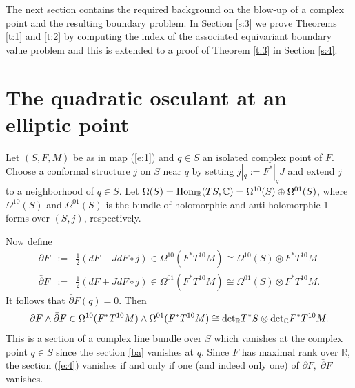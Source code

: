\documentclass{amsart}
\newcommand{\be}{\begin{equation}}
\newcommand{\ee}{\end{equation}}
\newcommand{\bea}{\begin{eqnarray}}
\newcommand{\eea}{\end{eqnarray}}
\begin{document}
The next section contains the required background on the blow-up of a complex point and the resulting boundary problem. In Section \ref{s:3} we prove Theorems \ref{t:1} and \ref{t:2} by computing the index of the associated equivariant boundary value problem and this is extended to a proof of Theorem \ref{t:3} in Section \ref{s:4}.  


\vspace{0.1in}
\section{The quadratic osculant at an elliptic point}\label{s:2}

Let $(S,F,M)$ be as in map (\ref{e:1}) and $ q \in  S$ an isolated complex point of $F$. Choose a conformal structure $j$ on $S$ near $q$ by setting $j|_q:=F^*|_q J$ and extend $j$ to a neighborhood of $ q \in  S$. Let  $\Omega (S)={\rm Hom_{\mathbb{R}}}(T S, {\mathbb{C}})=\Omega^{1 0}(S) \oplus \Omega^{0 1}(S)$, where $\Omega^{1 0}(S)$ and $\Omega^{0 1}(S)$ is the bundle of holomorphic and anti-holomorphic 1-forms over $(S,j)$, respectively.

Now define 
\bea 
\partial F &:=& {\textstyle{\frac{1}{2}}}(dF-JdF\circ j)\in\Omega^{10}(F^*T^{10}M)\cong \Omega^{10}(S)\otimes F^*T^{10}M \\ \label{ba}
\bar{\partial}F &:=&{\textstyle{\frac{1}{2}}}(dF+JdF\circ j) \in\Omega^{01}(F^*T^{10}M)\cong \Omega^{01}(S)\otimes F^*T^{10}M. 
\eea
It follows that $\bar{\partial}F(q)=0$. Then
\be \label{e:4}
\partial F\wedge\bar{\partial} F\in \Omega^{10}(F^*T^{10}M)\wedge 
\Omega^{01}(F^*T^{10}M) \cong
{\rm det_{\mathbb{R}}} T^*  S \otimes {\rm det}_{\mathbb{C}} F^*T^{10}M.
\ee
This is  a section of a complex line bundle over $S$ which vanishes at the complex point $ q \in  S$ since the section \eqref{ba} vanishes at $q$. Since $F$ has maximal rank over ${\mathbb{R}}$, the section (\ref{e:4}) vanishes if and only if one (and indeed only one) of $\partial F, \;\bar\partial F$ vanishes.
\end{document}
